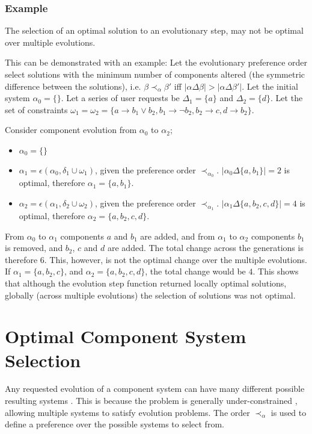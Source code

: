 \subsubsection{Example}
The selection of an optimal solution to an evolutionary step, may not be optimal over multiple evolutions.

This can be demonstrated with an example:
Let the evolutionary preference order select solutions with the minimum number of components altered (the symmetric difference between the solutions), 
i.e. $\beta \prec_{\alpha} \beta'$ iff $|\alpha \Delta \beta| > |\alpha \Delta \beta'|$.
Let the initial system $\alpha_0 = \{\}$.
Let a series of user requests be $\Delta_1 = \{a\}$ and $ \Delta_2 = \{d\}$. 
Let the set of constraints $\omega_1 = \omega_2 = \{a \rightarrow b_1 \vee b_2, b_1 \rightarrow \neg b_2, b_2 \rightarrow c, d \rightarrow b_2\}$.

Consider component evolution from $\alpha_0$ to $\alpha_2$;
\begin{itemize}
  \item $\alpha_0 = \{\}$
  \item $\alpha_1 = \epsilon(\alpha_0,\delta_1 \cup \omega_1)$, given the preference order $\prec_{\alpha_0}$. $|\alpha_0 \Delta \{a,b_1\}| = 2$ is optimal, therefore $\alpha_1 = \{a,b_1\}$.
  \item $\alpha_2 = \epsilon(\alpha_1,\delta_2 \cup \omega_2)$, given the preference order $\prec_{\alpha_1}$. $|\alpha_1 \Delta \{a,b_2,c,d\}| = 4$ is optimal, therefore $\alpha_2 = \{a,b_2,c,d\}$.
\end{itemize}

From $\alpha_0$ to $\alpha_1$ components $a$ and $b_1$ are added, 
and from $\alpha_1$ to $\alpha_2$ components $b_1$ is removed, and $b_2$, $c$ and $d$ are added.
The total change across the generations is therefore $6$.
This, however, is not the optimal change over the multiple evolutions.
If $\alpha_1 = \{a,b_2,c\}$, and $\alpha_2 = \{a,b_2,c,d\}$, the total change would be $4$.
This shows that although the evolution step function returned locally optimal solutions,
globally (across multiple evolutions) the selection of solutions was not optimal.

 
\section{Optimal Component System Selection}
\label{formal.opt}
Any requested evolution of a component system can have many different possible resulting systems \citep{leBerre2010}.
This is because the problem is generally under-constrained \citep{Berre2008}, allowing multiple systems to satisfy evolution problems.
The order $\prec_{\alpha}$ is used to define a preference over the possible systems to select from.

